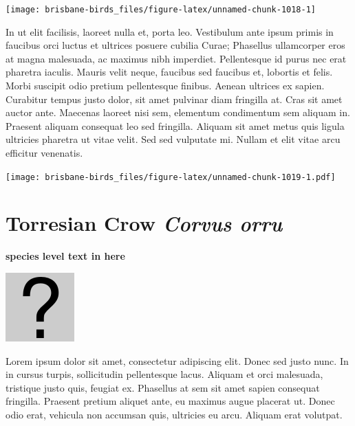 \documentclass[]{book}
\let\origfigure\figure
\let\endorigfigure\endfigure
\renewenvironment{figure}[1][2] {
  \expandafter\origfigure\expandafter[H]
} {
  \endorigfigure
}
\begin{document}
\begin{figure}
\texttt{[image: brisbane-birds\_files/figure-latex/unnamed-chunk-1018-1]} \caption{insert figure caption}\label{fig:unnamed-chunk-1018}
\end{figure}

In ut elit facilisis, laoreet nulla et, porta leo. Vestibulum ante ipsum
primis in faucibus orci luctus et ultrices posuere cubilia Curae;
Phasellus ullamcorper eros at magna malesuada, ac maximus nibh
imperdiet. Pellentesque id purus nec erat pharetra iaculis. Mauris velit
neque, faucibus sed faucibus et, lobortis et felis. Morbi suscipit odio
pretium pellentesque finibus. Aenean ultrices ex sapien. Curabitur
tempus justo dolor, sit amet pulvinar diam fringilla at. Cras sit amet
auctor ante. Maecenas laoreet nisi sem, elementum condimentum sem
aliquam in. Praesent aliquam consequat leo sed fringilla. Aliquam sit
amet metus quis ligula ultricies pharetra ut vitae velit. Sed sed
vulputate mi. Nullam et elit vitae arcu efficitur venenatis.

\begin{figure}
\centering
\texttt{[image: brisbane-birds\_files/figure-latex/unnamed-chunk-1019-1.pdf]}
\caption{\label{fig:unnamed-chunk-1019}insert figure caption}
\end{figure}

\section{\texorpdfstring{Torresian Crow \emph{Corvus
orru}}{Torresian Crow Corvus orru}}\label{torresian-crow-corvus-orru}

\textbf{species level text in here}

\begin{figure}
\centering
\includegraphics{assets/missing.png}
\caption{No image for species}
\end{figure}

Lorem ipsum dolor sit amet, consectetur adipiscing elit. Donec sed justo
nunc. In in cursus turpis, sollicitudin pellentesque lacus. Aliquam et
orci malesuada, tristique justo quis, feugiat ex. Phasellus at sem sit
amet sapien consequat fringilla. Praesent pretium aliquet ante, eu
maximus augue placerat ut. Donec odio erat, vehicula non accumsan quis,
ultricies eu arcu. Aliquam erat volutpat.
\end{document}
